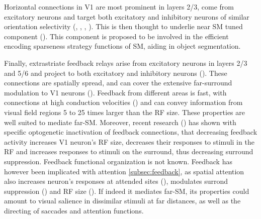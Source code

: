 Horizontal connections in V1 are most prominent in layers 2/3, come from excitatory neurons and target both excitatory and inhibitory neurons of similar orientation selectivity (\cite{Bosking1997}, \cite{Malach1993}, \cite{Schmidt1997}, \cite{Sincich2001}). This is then thought to underlie near SM tuned component (\cite{Gilbert1996}). This component is proposed to be involved in the efficient encoding sparseness strategy functions of SM, aiding in object segmentation.

Finally, extrastriate feedback relays arise from excitatory neurons in layers 2/3 and 5/6 and project to both excitatory and inhibitory neurons (\cite{Anderson2009}). These connections are spatially spread, and can cover the extensive far-surround modulation to V1 neurons (\cite{Angelucci2002}). Feedback from different areas is fast, with connections at high conduction velocities (\cite{Girard2001}) and can convey information from visual field regions 5 to 25 times larger than the RF size. These properties are well suited to mediate far-SM. Moreover, recent research (\cite{Nurminem2018}) has shown with specific optogenetic inactivation of feedback connections, that decreasing feedback activity increases V1 neuron's RF size, decreases their responses to stimuli in the RF and increases responses to stimuli on the surround, thus decreasing surround suppression. Feedback functional organization is not known. Feedback has however been implicated with attention \ref{subsec:feedback}, as spatial attention also increases neuron's responses at attended sites (\cite{McAdams2005}), modulates surrond suppression (\cite{Sundberg2009}) and RF size (\cite{Roberts2007}). If indeed it mediates far-SM, its properties could amount to visual salience in dissimilar stimuli at far distances, as well as the directing of saccades and attention functions. 

